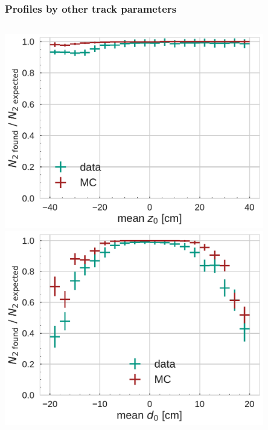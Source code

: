 \documentclass[18pt]{beamer}
\begin{document}
\begin{frame}
  \frametitle{Profiles by other track parameters}
  \begin{columns}
    \begin{column}{0.5\textwidth}
      \centering
      \includegraphics[width=0.85\textwidth]{figures/efficiency_study/cosmicbased_findeff_over_z0.pdf}\\
      \includegraphics[width=0.85\textwidth]{figures/efficiency_study/cosmicbased_findeff_over_d0.pdf}
      

\end{column}
\end{columns}
\end{frame}
\end{document}
